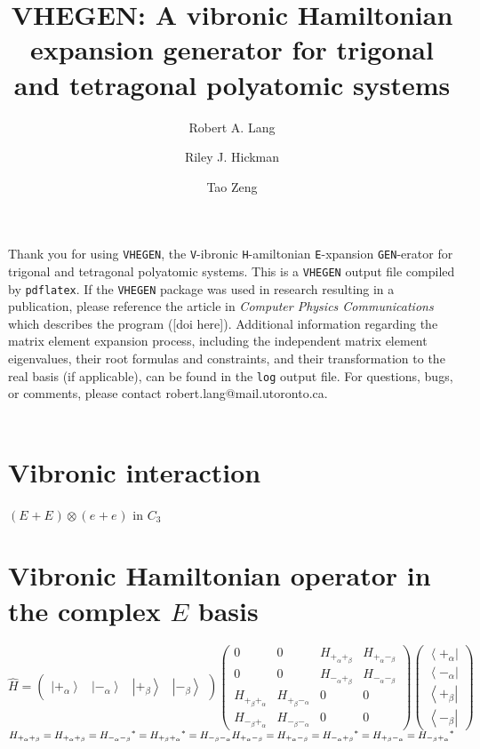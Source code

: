 \documentclass[fleqn]{article}
\title{VHEGEN: A vibronic Hamiltonian expansion generator for trigonal and tetragonal polyatomic systems}
\author{Robert A. Lang \and Riley J. Hickman \and Tao Zeng}
\date{}
\begin{document}
\maketitle
Thank you for using \texttt{VHEGEN}, the \texttt{V}-ibronic \texttt{H}-amiltonian \texttt{E}-xpansion \texttt{GEN}-erator for trigonal and tetragonal polyatomic systems. This is a \texttt{VHEGEN} output file compiled by \texttt{pdflatex}. If the \texttt{VHEGEN} package was used in research resulting in a publication, please reference the article in \textit{Computer Physics Communications} which describes the program ([doi here]). Additional information regarding the matrix element expansion process, including the independent matrix element eigenvalues, their root formulas and constraints, and their transformation to the real basis (if applicable), can be found in the \texttt{log} output file. For questions, bugs, or comments, please contact robert.lang@mail.utoronto.ca.\\\\
\tableofcontents
\newpage
\section{Vibronic interaction}
$(E_{}+E_{}) \otimes (e_{}+e_{})$ in $C_{3}$
\section{Vibronic Hamiltonian operator in the complex $E$ basis}
$\hat{H}=\left(\begin{matrix}{\left|+_\alpha\right\rangle } & {\left|-_\alpha\right\rangle } & {\left|+_\beta\right\rangle } & {\left|-_\beta\right\rangle }\end{matrix}\right) \left(\begin{matrix}0 & 0 & H_{+_{\alpha}+_{\beta}} & H_{+_{\alpha}-_{\beta}}\\0 & 0 & H_{-_{\alpha}+_{\beta}} & H_{-_{\alpha}-_{\beta}}\\H_{+_{\beta}+_{\alpha}} & H_{+_{\beta}-_{\alpha}} & 0 & 0\\H_{-_{\beta}+_{\alpha}} & H_{-_{\beta}-_{\alpha}} & 0 & 0\end{matrix}\right) \left(\begin{matrix}{\left\langle +_\alpha\right|}\\{\left\langle -_\alpha\right|}\\{\left\langle +_\beta\right|}\\{\left\langle -_\beta\right|}\end{matrix}\right)$\\$H_{+_{\alpha}+_{\beta}}=H_{+_{\alpha}+_{\beta}}={H_{-_{\alpha}-_{\beta}}}^*={H_{+_{\beta}+_{\alpha}}}^*=H_{-_{\beta}-_{\alpha}}\\H_{+_{\alpha}-_{\beta}}=H_{+_{\alpha}-_{\beta}}={H_{-_{\alpha}+_{\beta}}}^*=H_{+_{\beta}-_{\alpha}}={H_{-_{\beta}+_{\alpha}}}^*\\$
\end{document}
